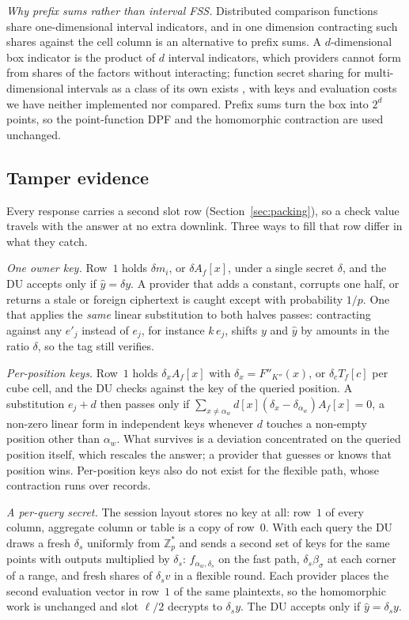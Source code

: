 \documentclass[a4paper,fleqn]{cas-sc}
\newif\ifauthorchecks
\newcommand{\authorcheck}[1]{\ifauthorchecks{\color{red}\textsf{[Authors: #1]}}\fi}
\begin{document}
\emph{Why prefix sums rather than interval FSS.} Distributed comparison
functions \citep{boyle2016function} share one-dimensional interval indicators,
and in one dimension contracting such shares against the cell column is an
alternative to prefix sums. A $d$-dimensional box indicator is the product of
$d$ interval indicators, which providers cannot form from shares of the
factors without interacting; function secret sharing for multi-dimensional
intervals as a class of its own exists \citep{boyle2016function}, with keys and
evaluation costs we have neither implemented nor compared. Prefix sums turn the box into $2^d$ points, so the
point-function DPF and the homomorphic contraction are used unchanged.
\authorcheck{Check the FSS literature for multi-dimensional interval
functions (key size, evaluation cost) and compare.}

\subsection{Tamper evidence}
\label{sec:verify}
Every response carries a second slot row (Section~\ref{sec:packing}), so a
check value travels with the answer at no extra downlink. Three ways to fill
that row differ in what they catch.

\emph{One owner key.} Row~$1$ holds $\delta m_i$, or $\delta A_f[x]$, under a
single secret $\delta$, and the DU accepts only if $\hat y=\delta y$. A provider
that adds a constant, corrupts one half, or returns a stale or foreign
ciphertext is caught except with probability $1/p$. One that applies the
\emph{same} linear substitution to both halves passes: contracting against any
$e'_j$ instead of $e_j$, for instance $k\,e_j$, shifts $y$ and $\hat y$ by
amounts in the ratio $\delta$, so the tag still verifies.

\emph{Per-position keys.} Row~$1$ holds $\delta_xA_f[x]$ with
$\delta_x=F''_{K''}(x)$, or $\delta_cT_f[c]$ per cube cell, and the DU checks
against the key of the queried position. A substitution $e_j+d$ then passes
only if $\sum_{x\neq\alpha_w}d[x](\delta_x-\delta_{\alpha_w})A_f[x]=0$, a
non-zero linear form in independent keys whenever $d$ touches a non-empty
position other than $\alpha_w$. What survives is a deviation concentrated on
the queried position itself, which rescales the answer; a provider that guesses
or knows that position wins. Per-position keys also do not exist for the
flexible path, whose contraction runs over records.

\emph{A per-query secret.} The session layout stores no key at all: row~$1$ of
every column, aggregate column or table is a copy of row~$0$. With each query
the DU draws a fresh $\delta_s$ uniformly from $\mathbb{Z}_p^{*}$ and sends a
second set of keys for the same points with outputs multiplied by $\delta_s$:
$f_{\alpha_w,\delta_s}$ on the fast path, $\delta_s\beta_\sigma$ at each corner
of a range, and fresh shares of $\delta_s v$ in a flexible round. Each provider
places the second evaluation vector in row~$1$ of the same plaintexts, so the
homomorphic work is unchanged and slot $\ell/2$ decrypts to $\delta_s y$. The
DU accepts only if $\hat y=\delta_s y$.
\end{document}
